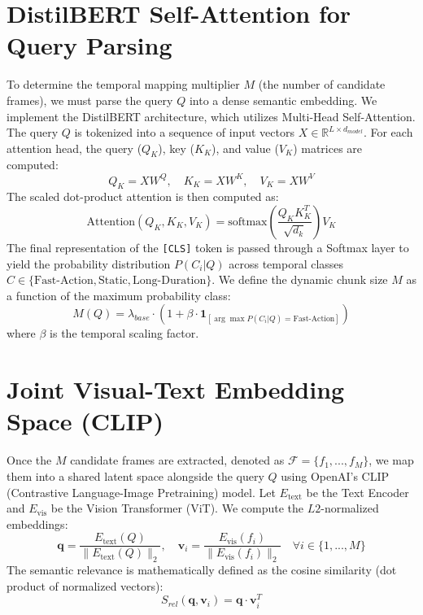 \documentclass[11pt, a4paper, oneside]{report}
\begin{document}
\section{DistilBERT Self-Attention for Query Parsing}
To determine the temporal mapping multiplier $M$ (the number of candidate frames), we must parse the query $Q$ into a dense semantic embedding. We implement the DistilBERT architecture, which utilizes Multi-Head Self-Attention.
The query $Q$ is tokenized into a sequence of input vectors $X \in \mathbb{R}^{L \times d_{model}}$. For each attention head, the query ($Q_K$), key ($K_K$), and value ($V_K$) matrices are computed:
\begin{equation}
Q_K = X W^Q, \quad K_K = X W^K, \quad V_K = X W^V
\end{equation}
The scaled dot-product attention is then computed as:
\begin{equation}
\text{Attention}(Q_K, K_K, V_K) = \text{softmax}\left(\frac{Q_K K_K^T}{\sqrt{d_k}}\right) V_K
\end{equation}
The final representation of the \texttt{[CLS]} token is passed through a Softmax layer to yield the probability distribution $P(C_i | Q)$ across temporal classes $C \in \{\text{Fast-Action}, \text{Static}, \text{Long-Duration}\}$. We define the dynamic chunk size $M$ as a function of the maximum probability class:
\begin{equation}
M(Q) = \lambda_{base} \cdot \left(1 + \beta \cdot \mathbf{1}_{[\arg\max P(C_i | Q) = \text{Fast-Action}]}\right)
\end{equation}
where $\beta$ is the temporal scaling factor.

\section{Joint Visual-Text Embedding Space (CLIP)}
Once the $M$ candidate frames are extracted, denoted as $\mathcal{F} = \{f_1, ..., f_M\}$, we map them into a shared latent space alongside the query $Q$ using OpenAI's CLIP (Contrastive Language-Image Pretraining) model.
Let $E_\text{text}$ be the Text Encoder and $E_\text{vis}$ be the Vision Transformer (ViT). We compute the $L2$-normalized embeddings:
\begin{equation}
\mathbf{q} = \frac{E_\text{text}(Q)}{\|E_\text{text}(Q)\|_2}, \quad \mathbf{v}_i = \frac{E_\text{vis}(f_i)}{\|E_\text{vis}(f_i)\|_2} \quad \forall i \in \{1, ..., M\}
\end{equation}
The semantic relevance is mathematically defined as the cosine similarity (dot product of normalized vectors):
\begin{equation}
S_{rel}(\mathbf{q}, \mathbf{v}_i) = \mathbf{q} \cdot \mathbf{v}_i^T
\end{equation}
\end{document}
